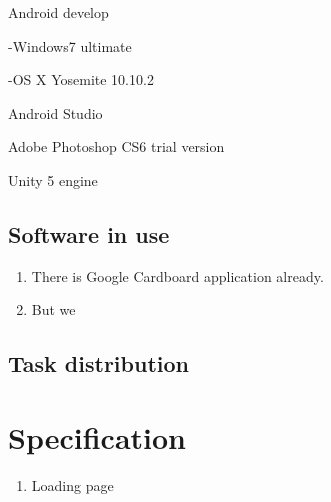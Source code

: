 \documentclass{article}
\begin{document}
\noindent 

\noindent Android develop

\noindent -Windows7 ultimate

\noindent -OS X Yosemite 10.10.2

\noindent 

\noindent Android Studio

\noindent 

\noindent Adobe Photoshop CS6 trial version

\noindent 

\noindent Unity 5 engine


\subsection{ Software in use}

\begin{enumerate}
\item  There is Google Cardboard application already.

\item  But we 
\end{enumerate}


\subsection{ Task distribution}


\section{ Specification}

\begin{enumerate}
\item  Loading page
\end{enumerate}

\noindent 

\noindent 

\noindent 

\noindent 

\noindent 

\noindent 

\noindent 

\noindent 

\noindent 

\noindent 

\noindent 

\noindent 

\noindent 

\noindent 
\end{document}
